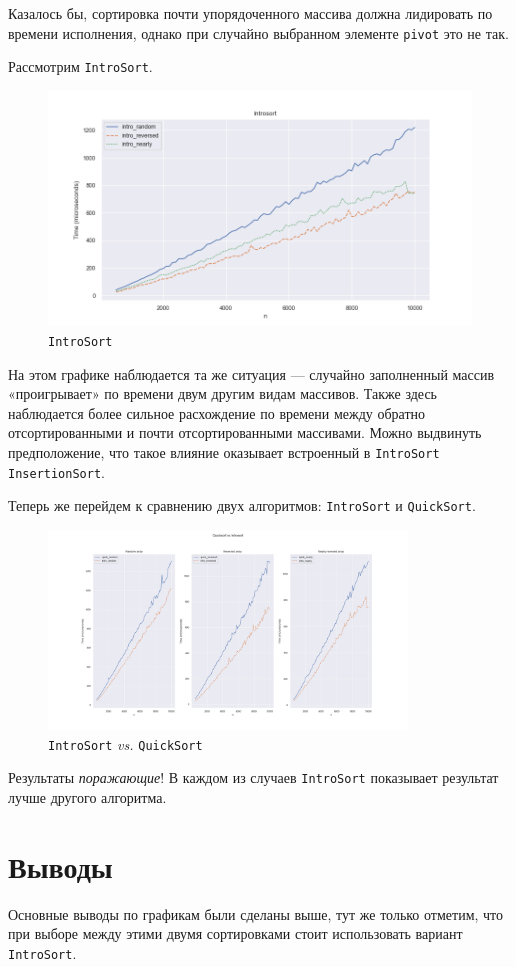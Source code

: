 \documentclass[11pt,a4paper]{scrarticle}
\theoremstyle{definition}
\begin{document}
Казалось бы, сортировка почти упорядоченного массива должна лидировать по времени исполнения, однако при случайно выбранном элементе \texttt{pivot} это не так.

Рассмотрим \texttt{IntroSort}.

\begin{figure}[htp]
	\centering
	\includegraphics[width=\textwidth]{../static/intro.png}
	\caption{\texttt{IntroSort}}
	\label{fig:quick}
\end{figure}
\FloatBarrier

На этом графике наблюдается та же ситуация --- случайно заполненный массив «проигрывает» по времени двум другим видам массивов. Также здесь наблюдается более сильное расхождение по времени между обратно отсортированными и почти отсортированными массивами. Можно выдвинуть предположение, что такое влияние оказывает встроенный в \texttt{IntroSort} \texttt{InsertionSort}.

Теперь же перейдем к сравнению двух алгоритмов: \texttt{IntroSort} и \texttt{QuickSort}.

\begin{figure}[htp]
	\centering
	\includegraphics[width=0.85\textwidth]{../static/array_types.png}
	\caption{\texttt{IntroSort} \emph{vs.} \texttt{QuickSort}}
	\label{fig:types}
\end{figure}
\FloatBarrier

Результаты \emph{поражающие}! В каждом из случаев \texttt{IntroSort} показывает результат лучше другого алгоритма.

\section*{Выводы}

Основные выводы по графикам были сделаны выше, тут же только отметим, что  при выборе между этими двумя сортировками стоит использовать вариант \texttt{IntroSort}.
\end{document}
